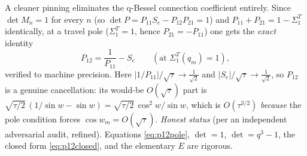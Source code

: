 \begin{remark}[The assembly: $R=O(\tau^{5/2})$ via the q-Bessel stationary-phase asymptotic coupled to the
travel-block phase]
A cleaner pinning eliminates the q-Bessel connection coefficient entirely. Since $\det M_n=1$ for every $n$
(so $\det P=P_{11}S_e-P_{12}P_{21}=1$) and $P_{11}+P_{21}=1-\Sigma_1^T$ identically, at a travel pole
($\Sigma_1^T=1$, hence $P_{21}=-P_{11}$) one gets the \emph{exact} identity
\begin{equation}\label{eq:p12pole}
   P_{12}=\frac1{P_{11}}-S_e\qquad(\text{at }\Sigma_1^T(q_m)=1),
\end{equation}
verified to machine precision. Here $|1/P_{11}|/\sqrt\tau\to\tfrac1{\sqrt2}$ and $|S_e|/\sqrt\tau\to\tfrac1{\sqrt2}$,
so $P_{12}$ is a genuine cancellation: its would-be $O(\sqrt\tau)$ part is $\sqrt{\tau/2}\,(1/\sin w-\sin w)=
\sqrt{\tau/2}\,\cos^2w/\sin w$, which is $O(\tau^{3/2})$ \emph{because} the pole condition forces $\cos w_m=
O(\sqrt\tau)$. \emph{Honest status} (per an independent adversarial audit, refined). Equations \eqref{eq:p12pole},
$\det=1$, $\det=q^3-1$, the closed form \eqref{eq:p12closed}, and the elementary $E$ are rigorous.


\end{remark}

